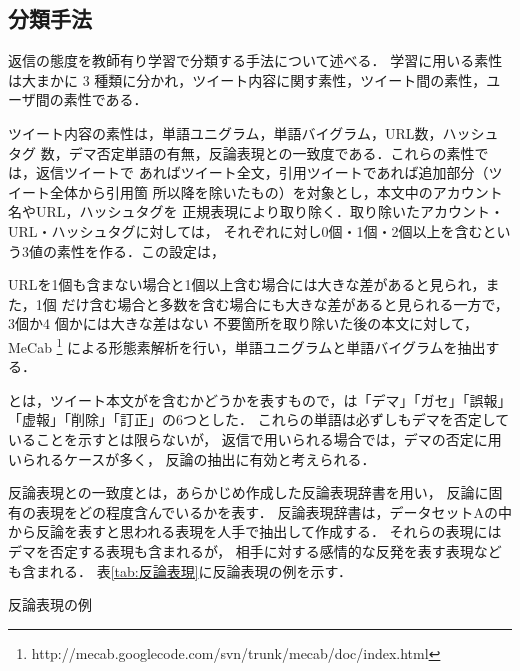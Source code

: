 \documentclass[japanese]{jnlp_1.4}
\newcommand{\addspan}[1]{}
\begin{document}
\subsection{分類手法}
\label{subsec:class_method}

返信の態度を教師有り学習で分類する手法について述べる．
学習に用いる素性は大まかに 3 種類に分かれ，ツイート内容に関す\addspan{る}素性，ツイート間の素性，ユーザ間の素性である．

ツイート内容の素性は，単語ユニグラム，単語バイグラム，URL数，ハッシュタグ
数，デマ否定単語の有無，反論表現との一致度である．これらの素性では，返信ツイートで
あればツイート全文，引用ツイートであれば追加部分（ツイート全体から引用箇
所以降を除いたもの）を対象とし，本文中のアカウント名やURL，ハッシュタグを
正規表現により取り除く．取り除いたアカウント・URL・ハッシュタグに対しては，
それぞれに対し0個・1個・2個以上を含むという3値の素性を作る．この設定は，
\addspan{実験に用いたツイートデータを観察した結果，}
URLを1個も含まない場合と1個以上含む場合には大きな差があると見られ，また，1個
だけ含む場合と多数を含む場合にも大きな差があると見られる一方で，3個か4
個かには大きな差はない\addspan{と見られたため導入した．}
不要箇所を取り除いた後の本文に対して，
MeCab \cite{Kudo04applyingconditional}\footnote{http://mecab.googlecode.com/svn/trunk/mecab/doc/index.html}
による形態素解析を行い，単語ユニグラムと単語バイグラムを抽出する．

\addspan{デマ否定単語の有無}とは，ツイート本文が\addspan{デマの否定を示す単語}を含むかどうかを表すもので，\addspan{デマ否定単語}は「デマ」「ガセ」「誤報」「虚報」「削除」「訂正」の6つとした．
これらの単語は必ずしもデマを否定していることを示すとは限らないが，
返信で用いられる場合では，デマの否定に用いられるケースが多く，
反論の抽出に有効と考えられる．

反論表現との一致度とは，あらかじめ作成した反論表現辞書を用い，
反論に固有の表現をどの程度含んでいるかを表す．
反論表現辞書は，データセットAの中から反論を表すと思われる表現を人手で抽出して作成する．
それらの表現にはデマを否定する表現も含まれるが，
相手に対する感情的な反発を表す表現なども含まれる．
表\ref{tab:反論表現}に反論表現の例を示す．

\begin{table}[b]
\vspace{-0.5\Cvs}
\caption{反論表現の例}
\label{tab:反論表現}

\vspace{-0.5\Cvs}
\end{table}
\end{document}
